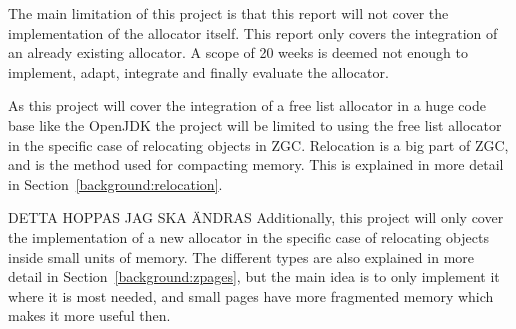 
The main limitation of this project is that this report will not cover the implementation of the allocator itself. This report only covers the integration of an already existing allocator. A scope of 20 weeks is deemed not enough to implement, adapt, integrate and finally evaluate the allocator.




As this project will cover the integration of a free list allocator in a huge code base like the OpenJDK the project will be limited to using the free list allocator in the specific case of relocating objects in ZGC. Relocation is a big part of ZGC, and is the method used for compacting memory. This is explained in more detail in Section~\ref{background:relocation}.

DETTA HOPPAS JAG SKA ÄNDRAS
Additionally, this project will only cover the implementation of a new allocator in the specific case of relocating objects inside small units of memory. The different types are also explained in more detail in Section~\ref{background:zpages}, but the main idea is to only implement it where it is most needed, and small pages have more fragmented memory which makes it more useful then.